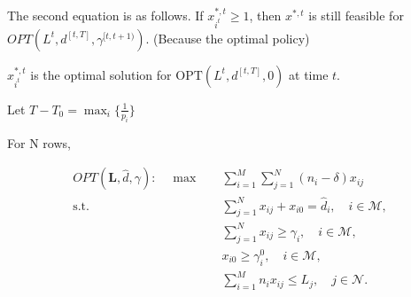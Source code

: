 The second equation is as follows. If $x_{i^{t}}^{*,t} \geq 1$, then $x^{*,t}$ is still feasible for $OPT(L^{t}, d^{[t, T]}, \gamma^{[t,t+1)})$. (Because the optimal policy)

$x_{i^{t}}^{*,t}$ is the optimal solution for $\text{OPT}(L^{t}, d^{[t, T]}, 0)$ at time $t$.

Let $T- T_{0} = \max_{i}\{\frac{1}{p_{i}}\}$


For N rows,

\begin{align*}
    OPT(\bm{L}, \hat{d}, \gamma): \quad \max \quad & \sum_{i = 1}^{M} \sum_{j = 1}^{N} (n_i - \delta) x_{ij} \\
    \text {s.t.} \quad & \sum_{j=1}^{N} x_{ij} + x_{i0} = \hat{d}_{i}, \quad i \in \mathcal{M},  \\ 
    & \sum_{j=1}^{N} x_{ij} \geq \gamma_{i}, \quad i \in \mathcal{M}, \\
    & x_{i0} \geq \gamma_{i}^{0}, \quad i \in \mathcal{M}, \\
    & \sum_{i=1}^{M} n_{i} x_{ij} \leq L_{j}, \quad j \in \mathcal{N}.
\end{align*}

